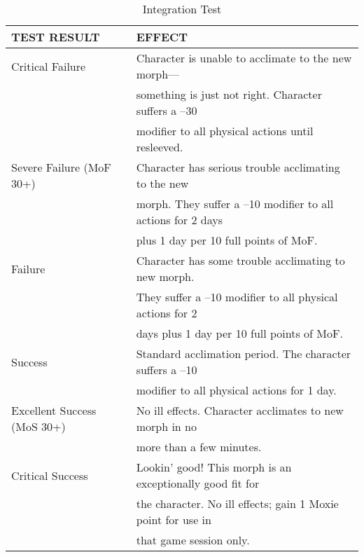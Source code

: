 \begin{table}
\caption{Integration Test}
\begin{tabular}{|l|l|}
\hline
TEST RESULT & EFFECT\\
\hline
Critical Failure & Character is unable to acclimate to the new morph—\\
& something is just not right. Character suffers a –30\\
& modifier to all physical actions until resleeved. \\
\hline
Severe Failure (MoF 30+) & Character has serious trouble acclimating to the new \\
& morph. They suffer a –10 modifier to all actions for 2 days \\
& plus 1 day per 10 full points of MoF. \\
\hline
Failure & Character has some trouble acclimating to new morph. \\
& They suffer a –10 modifier to all physical actions for 2 \\
& days plus 1 day per 10 full points of MoF. \\
\hline
Success & Standard acclimation period. The character suffers a –10 \\
& modifier to all physical actions for 1 day. \\
\hline
Excellent Success (MoS 30+) & No ill effects. Character acclimates to new morph in no \\
& more than a few minutes. \\
\hline
Critical Success & Lookin’ good! This morph is an exceptionally good fit for \\
& the character. No ill effects; gain 1 Moxie point for use in \\
& that game session only. \\
\hline
\end{tabular} 
\end{table}

